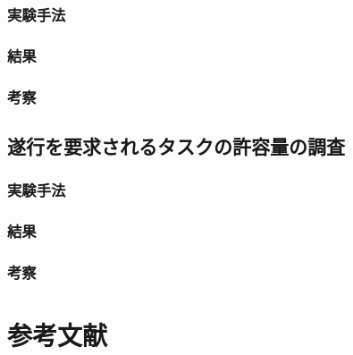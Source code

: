 \subsubsection{実験手法}\label{ux5b9fux9a13ux624bux6cd5}

\subsubsection{結果}\label{ux7d50ux679c}

\subsubsection{考察}\label{ux8003ux5bdf}

\subsection{遂行を要求されるタスクの許容量の調査}\label{ux9042ux884cux3092ux8981ux6c42ux3055ux308cux308bux30bfux30b9ux30afux306eux8a31ux5bb9ux91cfux306eux8abfux67fb}

\subsubsection{実験手法}\label{ux5b9fux9a13ux624bux6cd5-1}

\subsubsection{結果}\label{ux7d50ux679c-1}

\subsubsection{考察}\label{ux8003ux5bdf-1}

\section{参考文献}\label{ux53c2ux8003ux6587ux732e}
